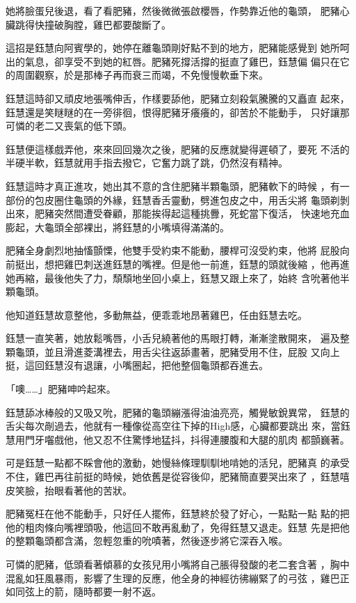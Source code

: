 她將臉蛋兒後退，看了看肥豬，然後微微張啟櫻唇，作勢靠近他的龜頭，
肥豬心臟跳得快撞破胸膛，雞巴都要酸斷了。

這招是鈺慧向阿賓學的，她停在離龜頭剛好點不到的地方，肥豬能感覺到
她所呵出的氣息，卻享受不到她的紅唇。肥豬死撐活撐的挺直了雞巴，鈺慧偏
偏只在它的周圍觀察，於是那棒子再而衰三而竭，不免慢慢軟垂下來。

鈺慧這時卻又頑皮地張嘴伸舌，作樣要舔他，肥豬立刻殺氣騰騰的又矗直
起來，鈺慧還是笑瞇瞇的在一旁徘徊，恨得肥豬牙癢癢的，卻苦於不能動手，
只好讓那可憐的老二又喪氣的低下頭。

鈺慧便這樣戲弄他，來來回回幾次之後，肥豬的反應就變得遲頓了，要死
不活的半硬半軟，鈺慧就用手指去撥它，它奮力跳了跳，仍然沒有精神。

鈺慧這時才真正進攻，她出其不意的含住肥豬半顆龜頭，肥豬軟下的時候
，有一部份的包皮圈住龜頭的外緣，鈺慧香舌靈動，劈進包皮之中，用舌尖將
龜頭剃剝出來，肥豬突然間遭受眷顧，那能挨得起這種挑釁，死蛇當下復活，
快速地充血膨起，大龜頭全部裸出，將鈺慧的小嘴填得滿滿的。

肥豬全身劇烈地抽慉顫慄，他雙手受約束不能動，腰桿可沒受約束，他將
屁股向前挺出，想把雞巴刺送進鈺慧的嘴裡。但是他一前進，鈺慧的頭就後縮
，他再進她再縮，最後他失了力，頹頹地坐回小桌上，鈺慧又跟上來了，始終
含吮著他半顆龜頭。

他知道鈺慧故意整他，多動無益，便乖乖地昂著雞巴，任由鈺慧去吃。

鈺慧一直笑著，她放鬆嘴唇，小舌兒繞著他的馬眼打轉，漸漸塗散開來，
遍及整顆龜頭，並且滑進菱溝裡去，用舌尖往返舔畫著，肥豬受用不住，屁股
又向上挺，這回鈺慧沒有退讓，小嘴圈起，把他整個龜頭都吞進去。

「噢……」肥豬呻吟起來。

鈺慧舔冰棒般的又吸又吮，肥豬的龜頭繃漲得油油亮亮，觸覺敏銳異常，
鈺慧的舌尖每次剮過去，他就有一種像從高空往下掉的High感，心臟都要跳出
來，當鈺慧用門牙囓戲他，他又忍不住驚悸地猛抖，抖得連腰腹和大腿的肌肉
都顫巍著。

可是鈺慧一點都不睬會他的激動，她慢絲條理馴馴地啃她的活兒，肥豬真
的承受不住，雞巴再往前挺的時候，她依舊是從容後仰，肥豬簡直要哭出來了
，鈺慧嘻皮笑臉，抬眼看著他的苦狀。

肥豬冤枉在他不能動手，只好任人擺佈，鈺慧終於發了好心，一點點一點
點的把他的粗肉條向嘴裡頭吸，他這回不敢再亂動了，免得鈺慧又退走。鈺慧
先是把他的整顆龜頭都含滿，忽輕忽重的吮嘖著，然後逐步將它深吞入喉。

可憐的肥豬，低頭看著傾慕的女孩兒用小嘴將自己脹得發酸的老二套含著
，胸中混亂如狂風暴雨，影響了生理的反應，他全身的神經彷彿繃緊了的弓弦
，雞巴正如同弦上的箭，隨時都要一射不返。

